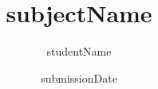 \documentclass[a4paper,12pt,numbers=noenddot]{scrreprt} %
\title{subjectName}
\author{studentName}
\date{submissionDate}
\begin{document}

\begin{titlepage}
\clearpage
\vspace*{\fill}
\begin{center}
\begin{minipage}{.6\textwidth}
\maketitle
\end{minipage}
\end{center}
\vfill %
\clearpage
\end{titlepage}




\ihead{\normalfont \rightmark \newline }
\setcounter{tocdepth}{1}
\tableofcontents
\end{document}
